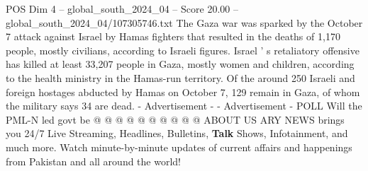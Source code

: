\begin{textsample}{POS Dim 4 – global\_south\_2024\_04 – Score 20.00 – global\_south\_2024\_04/107305746.txt}
The Gaza war was sparked by the October 7 attack against Israel by Hamas fighters that resulted in the deaths of 1,170 people, mostly civilians, according to Israeli figures.
Israel ' s retaliatory offensive has killed at least 33,207 people in Gaza, mostly women and children, according to the health ministry in the Hamas-run territory.
Of the around 250 Israeli and foreign hostages abducted by Hamas on October 7, 129 remain in Gaza, of whom the military says 34 are dead. - Advertisement - - Advertisement - POLL Will the PML-N led govt be @ @ @ @ @ @ @ @ @ @ ABOUT US ARY NEWS brings you 24/7 Live Streaming, Headlines, Bulletins, \textbf{Talk} Shows, Infotainment, and much more.
Watch minute-by-minute updates of current affairs and happenings from Pakistan and all around the world!

\end{textsample}
